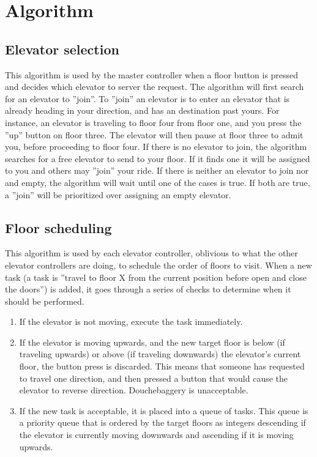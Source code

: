 \section{Algorithm}
\subsection{Elevator selection}
\label{alg:sel}
This algorithm is used by the master controller when a floor button is pressed and decides which elevator to server the request. The algorithm will first search for an elevator to ''join''. To ''join'' an elevator is to enter an elevator that is already heading in your direction, and has an destination past yours. For instance, an elevator is traveling to floor four from floor one, and you press the ''up'' button on floor three. The elevator will then pause at floor three to admit you, before proceeding to floor four.\newline
If there is no elevator to join, the algorithm searches for a free elevator to send to your floor. If it finds one it will be assigned to you and others may ''join'' your ride.\newline
If there is neither an elevator to join nor and empty, the algorithm will wait until one of the cases is true. If both are true, a ''join'' will be prioritized over assigning an empty elevator.

\subsection{Floor scheduling}
\label{alg:sched}
This algorithm is used by each elevator controller, oblivious to what the other elevator controllers are doing, to schedule the order of floors to visit.\newline
When a new task (a task is ''travel to floor X from the current position before open and close the doors'') is added, it goes through a series of checks to determine when it should be performed.
\begin{enumerate}
\item If the elevator is not moving, execute the task immediately.
\item If the elevator is moving upwards, and the new target floor is below (if traveling upwards) or above (if traveling downwards) the elevator's current floor, the button press is discarded. This means that someone has requested to travel one direction, and then pressed a button that would cause the elevator to reverse direction. Douchebaggery is unacceptable. 
\item If the new task is acceptable, it is placed into a queue of tasks. This queue is a priority queue that is ordered by the target floors as integers descending if the elevator is currently moving downwards and ascending if it is moving upwards. 
\end{enumerate}